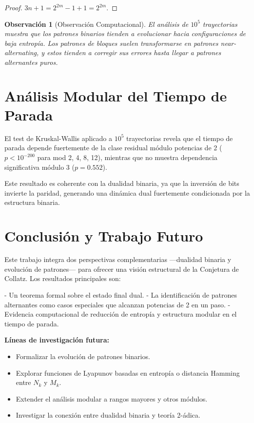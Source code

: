 \documentclass[11pt,a4paper]{article}
\newtheorem{remark}[theorem]{Observación}
\begin{document}
\begin{proof}
$3n + 1 = 2^{2m} - 1 + 1 = 2^{2m}$.
\end{proof}

\begin{remark}[Observación Computacional]
El análisis de $10^5$ trayectorias muestra que los patrones binarios tienden a evolucionar hacia configuraciones de baja entropía. Los patrones de bloques suelen transformarse en patrones near-alternating, y estos tienden a corregir sus errores hasta llegar a patrones alternantes puros.
\end{remark}

\section{Análisis Modular del Tiempo de Parada}

El test de Kruskal-Wallis aplicado a $10^5$ trayectorias revela que el tiempo de parada depende fuertemente de la clase residual módulo potencias de 2 ($p < 10^{-200}$ para mod 2, 4, 8, 12), mientras que no muestra dependencia significativa módulo 3 ($p = 0.552$).

Este resultado es coherente con la dualidad binaria, ya que la inversión de bits invierte la paridad, generando una dinámica dual fuertemente condicionada por la estructura binaria.

\section{Conclusión y Trabajo Futuro}

Este trabajo integra dos perspectivas complementarias —dualidad binaria y evolución de patrones— para ofrecer una visión estructural de la Conjetura de Collatz. Los resultados principales son:

- Un teorema formal sobre el estado final dual.
- La identificación de patrones alternantes como casos especiales que alcanzan potencias de 2 en un paso.
- Evidencia computacional de reducción de entropía y estructura modular en el tiempo de parada.

\textbf{Líneas de investigación futura:}
\begin{itemize}
    \item Formalizar la evolución de patrones binarios.
    \item Explorar funciones de Lyapunov basadas en entropía o distancia Hamming entre $N_k$ y $M_k$.
    \item Extender el análisis modular a rangos mayores y otros módulos.
    \item Investigar la conexión entre dualidad binaria y teoría 2-ádica.
\end{itemize}
\end{document}
